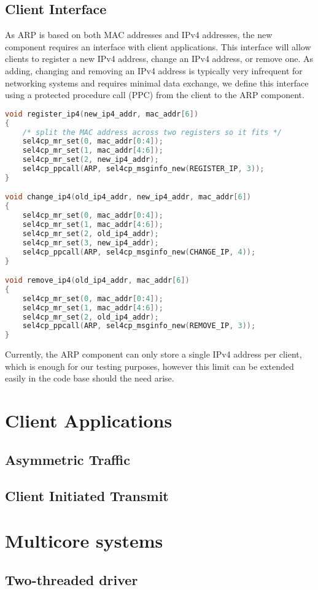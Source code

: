 \subsection{Client Interface}
As ARP is based on both MAC addresses and IPv4 addresses, the new component
requires an interface with client applications. This interface will allow clients
to register a new IPv4 address, change an IPv4 address, or remove one. As adding,
changing and removing an IPv4 address is typically very infrequent for networking systems
and requires minimal data exchange, we define this interface using a protected procedure
call (PPC) from the client to the ARP component. 

\begin{minipage}{\textwidth}
    \fontsmall
    \centering
    \begin{lstlisting}[tabsize=2, language=C, caption={Client Interface to ARP Component},frame=tb, 
                        label={l:arpintf}, captionpos=b]
void register_ip4(new_ip4_addr, mac_addr[6])
{
    /* split the MAC address across two registers so it fits */
    sel4cp_mr_set(0, mac_addr[0:4]);
    sel4cp_mr_set(1, mac_addr[4:6]);
    sel4cp_mr_set(2, new_ip4_addr);
    sel4cp_ppcall(ARP, sel4cp_msginfo_new(REGISTER_IP, 3));
}

void change_ip4(old_ip4_addr, new_ip4_addr, mac_addr[6])
{
    sel4cp_mr_set(0, mac_addr[0:4]);
    sel4cp_mr_set(1, mac_addr[4:6]);
    sel4cp_mr_set(2, old_ip4_addr);
    sel4cp_mr_set(3, new_ip4_addr);
    sel4cp_ppcall(ARP, sel4cp_msginfo_new(CHANGE_IP, 4));
}

void remove_ip4(old_ip4_addr, mac_addr[6])
{
    sel4cp_mr_set(0, mac_addr[0:4]);
    sel4cp_mr_set(1, mac_addr[4:6]);
    sel4cp_mr_set(2, old_ip4_addr);
    sel4cp_ppcall(ARP, sel4cp_msginfo_new(REMOVE_IP, 3));
}
    \end{lstlisting}
\end{minipage}

Currently, the ARP component can only store a single IPv4 address per client, which
is enough for our testing purposes, however this limit can be extended easily in the code
base should the need arise.\\

\section{Client Applications}

\subsection{Asymmetric Traffic}

\subsection{Client Initiated Transmit}

\section{Multicore systems}

\subsection{Two-threaded driver}
